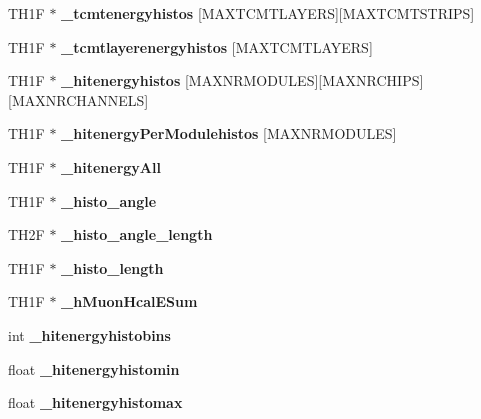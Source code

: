 \begin{DoxyCompactItemize}
\item 
T\-H1\-F $\ast$ {\bfseries \-\_\-tcmtenergyhistos} [M\-A\-X\-T\-C\-M\-T\-L\-A\-Y\-E\-R\-S][M\-A\-X\-T\-C\-M\-T\-S\-T\-R\-I\-P\-S]\label{classCellAnalysisProcessor_a93ffb20f66c77d0d634861972c80433a}

\item 
T\-H1\-F $\ast$ {\bfseries \-\_\-tcmtlayerenergyhistos} [M\-A\-X\-T\-C\-M\-T\-L\-A\-Y\-E\-R\-S]\label{classCellAnalysisProcessor_a171505082bf368dfe059d7c5ea636ec1}

\item 
T\-H1\-F $\ast$ {\bfseries \-\_\-hitenergyhistos} [M\-A\-X\-N\-R\-M\-O\-D\-U\-L\-E\-S][M\-A\-X\-N\-R\-C\-H\-I\-P\-S][M\-A\-X\-N\-R\-C\-H\-A\-N\-N\-E\-L\-S]\label{classCellAnalysisProcessor_abe9cc1725be61c389b70abd43791a8ef}

\item 
T\-H1\-F $\ast$ {\bfseries \-\_\-hitenergy\-Per\-Modulehistos} [M\-A\-X\-N\-R\-M\-O\-D\-U\-L\-E\-S]\label{classCellAnalysisProcessor_ac421ca529c9c5f59d9f30ae91976a19d}

\item 
T\-H1\-F $\ast$ {\bfseries \-\_\-hitenergy\-All}\label{classCellAnalysisProcessor_a9dbc72d25ba3ea61afad091824bb0d23}

\item 
T\-H1\-F $\ast$ {\bfseries \-\_\-histo\-\_\-angle}\label{classCellAnalysisProcessor_a54963d51732ca11c544d28d2b46a4481}

\item 
T\-H2\-F $\ast$ {\bfseries \-\_\-histo\-\_\-angle\-\_\-length}\label{classCellAnalysisProcessor_aae093b58b62c4bedd21d65a3d167e15e}

\item 
T\-H1\-F $\ast$ {\bfseries \-\_\-histo\-\_\-length}\label{classCellAnalysisProcessor_a98dddeb420929ad38af64a28a60464a8}

\item 
T\-H1\-F $\ast$ {\bfseries \-\_\-h\-Muon\-Hcal\-E\-Sum}\label{classCellAnalysisProcessor_a79e268c370d2149184071b1b57b5591f}

\item 
int {\bfseries \-\_\-hitenergyhistobins}\label{classCellAnalysisProcessor_a568909800005abf7c332e9e015de3da5}

\item 
float {\bfseries \-\_\-hitenergyhistomin}\label{classCellAnalysisProcessor_a948d7a77688d1ea74f84bad154af22fa}

\item 
float {\bfseries \-\_\-hitenergyhistomax}\label{classCellAnalysisProcessor_a73d5f3effdc45d019b71c73feb9ef7ad}


\end{DoxyCompactItemize}
